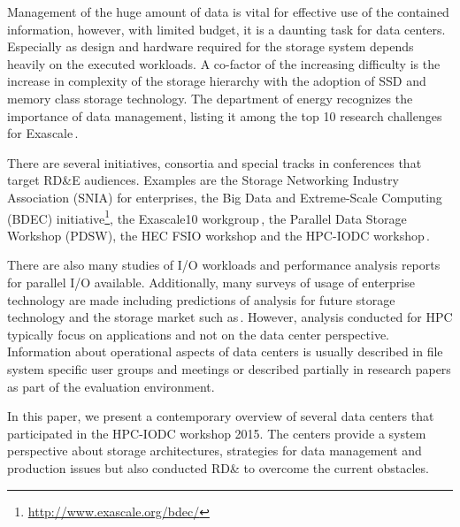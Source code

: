 \documentclass{superfri}
\numberwithin{equation}{section}
\begin{document}
Management of the huge amount of data is vital for effective use of the contained information, however, with limited budget, it is a daunting task for data centers.
Especially as design and hardware required for the storage system depends heavily on the executed workloads.
A co-factor of the increasing difficulty is the increase in complexity of the storage hierarchy with the adoption of SSD and memory class storage technology.
The department of energy recognizes the importance of data management, listing it among the top 10 research challenges for Exascale\,\cite{top14}. %

There are several initiatives, consortia and special tracks in conferences that target RD\&E audiences.
Examples are the Storage Networking Industry Association (SNIA) for enterprises, the 
Big Data and Extreme-Scale Computing (BDEC) initiative\footnote{\url{http://www.exascale.org/bdec/}}, the 
Exascale10 workgroup\,\cite{brinkmann14}, the Parallel Data Storage Workshop (PDSW), the HEC FSIO workshop \cite{bancroft2009} and the HPC-IODC workshop\,\cite{iodc}.

There are also many studies of I/O workloads and performance analysis reports for parallel I/O available.
Additionally, many surveys of usage of enterprise technology are made including predictions of analysis for future storage technology and the storage market such as\,\cite{idc1}.
However, analysis conducted for HPC typically focus on applications and not on the data center perspective.
Information about operational aspects of data centers is usually described in file system specific user groups and meetings or described partially in research papers as part of the evaluation environment.


In this paper, we present a contemporary overview of several data centers that participated in the HPC-IODC workshop 2015.
The centers provide a system perspective about storage architectures, strategies for data management and production issues but also conducted RD\& to overcome the current obstacles.
\end{document}
